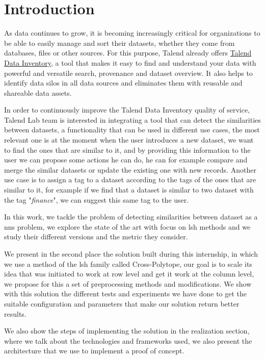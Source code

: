 \chapter*{Introduction}

As data continues to grow, it is becoming increasingly critical for
organizations to be able to easily manage and sort their datasets, whether they
come from databases, files or other sources. For this purpose, Talend already
offers \href{https://www.talend.com/products/data-inventory/}{Talend Data
Inventory}, a tool that makes it easy to find and understand your data with
powerful and versatile search, provenance and dataset overview. It also helps to
identify data silos in all data sources and eliminates them with reusable and
shareable data assets.

In order to continuously improve the Talend Data Inventory quality of service,  
Talend Lab team is interested in integrating a tool that can detect the
similarities between datasets, a functionality that can be used in different use
cases, the most relevant one is at the moment when the user introduces a new
dataset, we want to find the ones that are similar to it, and by providing this
information to the user we can propose some actions he can do, he can for
example compare and merge the similar datasets or update the existing one with
new records. Another use case is to assign a tag to a dataset according to the
tags of the ones that are similar to it, for example if we find that a dataset
is similar to two dataset with the tag "\textit{finance}", we can suggest this
same tag to the user.

In this work, we tackle the problem of detecting similarities between dataset as
a \Acrfull{nns} problem, we explore the state of the art with focus on
\Acrfull{lsh} methods and we study their different versions and the metric they
consider.

We present in the second place the solution built during this internship, in
which we use a method of the \acrshort{lsh} family called Cross-Polytope, our
goal is to scale its idea that was initiated to work at row level and get it
work at the column level, we propose for this a set of preprocessing methods and
modifications. We show with this solution the different tests and experiments we
have done to get the suitable configuration and parameters that make our
solution return better results.

We also show the steps of implementing the solution in the realization section,
where we talk about the technologies and frameworks used, we also present
the architecture that we use to implement a proof of concept.

